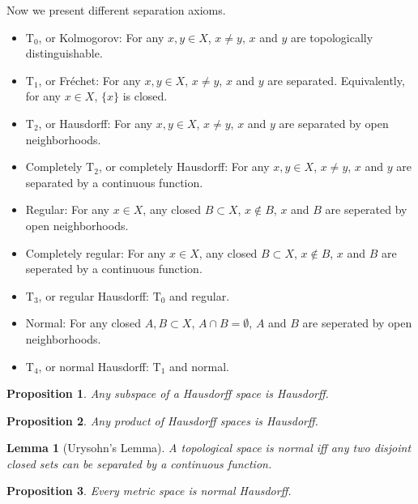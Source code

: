 \documentclass[openany]{book}
\newtheorem{lemma}{Lemma}[chapter]
\newtheorem{proposition}{Proposition}[chapter]
\theoremstyle{definition}
\theoremstyle{remark}
\begin{document}
Now we present different separation axioms.
\begin{itemize}
    \item $\mathrm{T}_0$, or Kolmogorov: For any $x,y\in X$, $x\ne y$, $x$ and $y$ are topologically distinguishable.
    \item $\mathrm{T}_1$, or Fr\'{e}chet: For any $x,y\in X$, $x\ne y$, $x$ and $y$ are separated. Equivalently, for any $x\in X$, $\{x\}$ is closed.
    \item $\mathrm{T}_2$, or Hausdorff: For any $x,y\in X$, $x\ne y$, $x$ and $y$ are separated by open neighborhoods.
    \item Completely $\mathrm{T}_2$, or completely Hausdorff: For any $x,y\in X$, $x\ne y$, $x$ and $y$ are separated by a continuous function.
    \item Regular: For any $x\in X$, any closed $B\subset X$, $x\not\in B$, $x$ and $B$ are seperated by open neighborhoods.
    \item Completely regular: For any $x\in X$, any closed $B\subset X$, $x\not\in B$, $x$ and $B$ are seperated by a continuous function.
    \item $\mathrm{T}_3$, or regular Hausdorff: $\mathrm{T}_0$ and regular.
    \item Normal: For any closed $A,B\subset X$, $A\cap B=\emptyset$, $A$ and $B$ are seperated by open neighborhoods.
    \item $\mathrm{T}_4$, or normal Hausdorff: $\mathrm{T}_1$ and normal.
\end{itemize}
\begin{proposition}
    Any subspace of a Hausdorff space is Hausdorff.
\end{proposition}
\begin{proposition}
    Any product of Hausdorff spaces is Hausdorff.
\end{proposition}
\begin{lemma}[Urysohn's Lemma]
    A topological space is normal iff any two disjoint closed sets can be separated by a continuous function.
\end{lemma}
\begin{proposition}
    Every metric space is normal Hausdorff.
\end{proposition}
\end{document}
